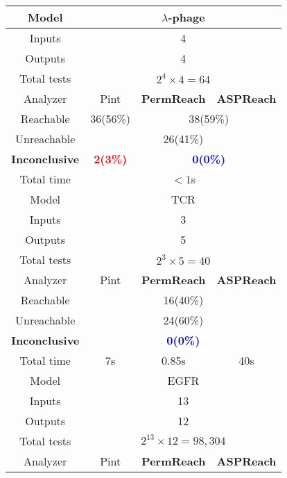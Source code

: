 \begin{table}[ht]
    \begin{tabular}{|c|c|c|c|}
    \hline
     Model    &  \multicolumn{3}{c|}{$\lambda$-phage}\\
     \hline
     Inputs    & \multicolumn{3}{c|}{4}\\
     \hline
     Outputs&\multicolumn{3}{c|}{4}\\
     \hline
     Total tests&\multicolumn{3}{c|}{$2^4\times 4=64$}\\
     \hline
     Analyzer  &  Pint  &  \textbf{PermReach}   &\textbf{ASPReach}\\
     \hline
     Reachable & 36(56\%)& \multicolumn{2}{c|}{38(59\%)} \\
     \hline
     Unreachable&\multicolumn{3}{c|}{26(41\%)}\\
     \hline
     \textbf{Inconclusive} &\textcolor{red}{\textbf{2(3\%)}}&\multicolumn{2}{c|}{\textcolor{blue}{\textbf{0(0\%)}}}\\
     \hline
     Total time & \multicolumn{3}{c|}{$<1$s}\\
    \hline
     Model    &  \multicolumn{3}{c|}{TCR}\\
     \hline
     Inputs    & \multicolumn{3}{c|}{3}\\
     \hline
     Outputs&\multicolumn{3}{c|}{5}\\
     \hline
     Total tests&\multicolumn{3}{c|}{$2^3\times 5=40$}\\
     \hline
     Analyzer  &  Pint  &  \textbf{PermReach}   &\textbf{ASPReach}\\
     \hline
     Reachable & \multicolumn{3}{c|}{16(40\%)} \\
     \hline
     Unreachable&\multicolumn{3}{c|}{24(60\%)} \\
     \hline
     \textbf{Inconclusive} &\multicolumn{3}{c|}{\textcolor{blue}{\textbf{0(0\%)}}} \\
     \hline
     Total time &  7s     &0.85s  &  40s        \\
    \hline
     Model    &  \multicolumn{3}{c|}{EGFR}\\
     \hline
     Inputs    & \multicolumn{3}{c|}{13}\\
     \hline
     Outputs&\multicolumn{3}{c|}{12}\\
     \hline
     Total tests&\multicolumn{3}{c|}{$2^{13}\times 12=98,304$}\\
     \hline
     Analyzer  &  Pint  &  \textbf{PermReach}   &\textbf{ASPReach}\\

\end{tabular}
\end{table}
